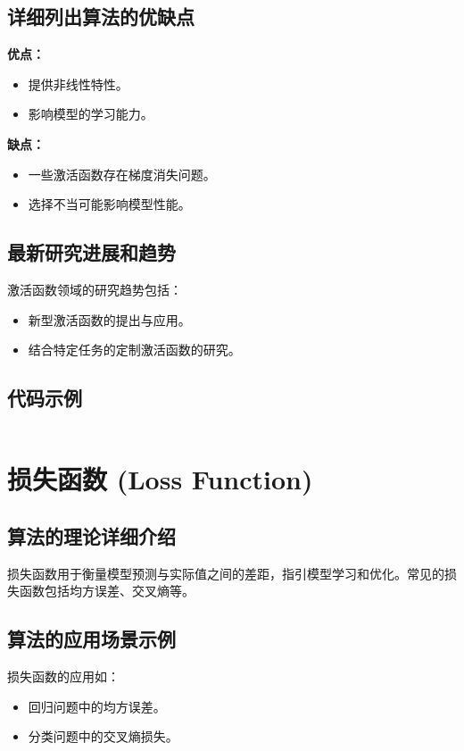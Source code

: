 \subsection*{详细列出算法的优缺点}
\textbf{优点：}
\begin{itemize}
    \item 提供非线性特性。
    \item 影响模型的学习能力。
\end{itemize}

\textbf{缺点：}
\begin{itemize}
    \item 一些激活函数存在梯度消失问题。
    \item 选择不当可能影响模型性能。
\end{itemize}

\subsection*{最新研究进展和趋势}
激活函数领域的研究趋势包括：
\begin{itemize}
    \item 新型激活函数的提出与应用。
    \item 结合特定任务的定制激活函数的研究。
\end{itemize}
\subsection*{代码示例}
\begin{lstlisting}

\end{lstlisting}


\section{损失函数 (Loss Function)}
\subsection*{算法的理论详细介绍}
损失函数用于衡量模型预测与实际值之间的差距，指引模型学习和优化。常见的损失函数包括均方误差、交叉熵等。

\subsection*{算法的应用场景示例}
损失函数的应用如：
\begin{itemize}
    \item 回归问题中的均方误差。
    \item 分类问题中的交叉熵损失。
\end{itemize}

